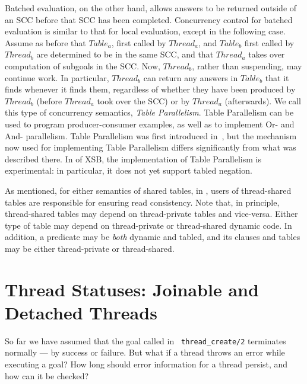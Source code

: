 Batched evaluation, on the other hand, allows answers to be returned
outside of an SCC before that SCC has been completed.  Concurrency
control for batched evaluation is similar to that for local
evaluation, except in the following case.  Assume as before that
$Table_a$, first called by $Thread_a$, and $Table_b$ first called by
$Thread_b$ are determined to be in the same SCC, and that $Thread_a$
takes over computation of subgoals in the SCC.  Now, $Thread_b$,
rather than suspending, may continue work.  In particular, $Thread_b$
can return any answers in $Table_b$ that it finds whenever it finds
them, regardless of whether they have been produced by $Thread_b$
(before $Thread_a$ took over the SCC) or by $Thread_a$ (afterwards).
We call this type of concurrency semantics, {\em Table Parallelism}.
Table Parallelism can be used to program producer-consumer examples,
as well as to implement Or- and And- parallelism.  Table Parallelism
was first introduced in~\cite{FHSW95}, but the mechanism now used for
implementing Table Parallelism differs significantly from what was
described there.  In \version{} of XSB, the implementation of Table
Parallelism is experimental: in particular, it does not yet support
tabled negation.

As mentioned, for either semantics of shared tables, in \version{},
users of thread-shared tables are responsible for ensuring read
consistency.  Note that, in principle, thread-shared tables may depend
on thread-private tables and vice-versa.  Either type of table may
depend on thread-private or thread-shared dynamic code.  In addition,
a predicate may be {\em both} dynamic and tabled, and its clauses and
tables may be either thread-private or thread-shared.

\section{Thread Statuses: Joinable and Detached Threads} \label{sec:thread-status}

So far we have assumed that the goal called in {\tt
  thread\_create/2} terminates normally --- by success or
failure.  But what if a thread throws an error while executing a goal?
How long should error information for a thread persist, and how can it
be checked?


